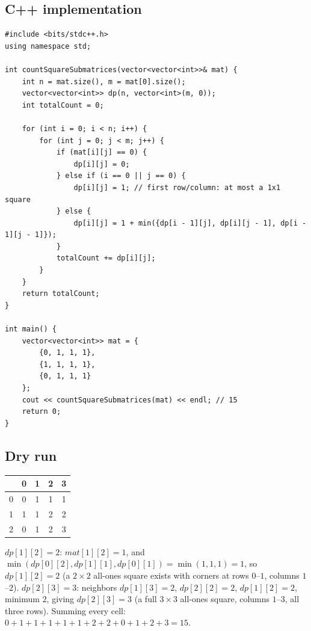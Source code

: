 \subsection*{C++ implementation}

\begin{lstlisting}
#include <bits/stdc++.h>
using namespace std;

int countSquareSubmatrices(vector<vector<int>>& mat) {
    int n = mat.size(), m = mat[0].size();
    vector<vector<int>> dp(n, vector<int>(m, 0));
    int totalCount = 0;

    for (int i = 0; i < n; i++) {
        for (int j = 0; j < m; j++) {
            if (mat[i][j] == 0) {
                dp[i][j] = 0;
            } else if (i == 0 || j == 0) {
                dp[i][j] = 1; // first row/column: at most a 1x1 square
            } else {
                dp[i][j] = 1 + min({dp[i - 1][j], dp[i][j - 1], dp[i - 1][j - 1]});
            }
            totalCount += dp[i][j];
        }
    }
    return totalCount;
}

int main() {
    vector<vector<int>> mat = {
        {0, 1, 1, 1},
        {1, 1, 1, 1},
        {0, 1, 1, 1}
    };
    cout << countSquareSubmatrices(mat) << endl; // 15
    return 0;
}
\end{lstlisting}

\subsection*{Dry run}


\begin{center}
\begin{tabular}{c|c|c|c|c}
 & 0 & 1 & 2 & 3 \\ \hline
0 & 0 & 1 & 1 & 1 \\ \hline
1 & 1 & 1 & 2 & 2 \\ \hline
2 & 0 & 1 & 2 & 3
\end{tabular}
\end{center}

$\textit{dp}[1][2]=2$: $\textit{mat}[1][2]=1$, and
$\min(\textit{dp}[0][2],\textit{dp}[1][1],\textit{dp}[0][1])=
\min(1,1,1)=1$, so $\textit{dp}[1][2]=2$ (a $2\times2$ all-ones square
exists with corners at rows $0$--$1$, columns $1$--$2$).
$\textit{dp}[2][3]=3$: neighbors $\textit{dp}[1][3]=2$,
$\textit{dp}[2][2]=2$, $\textit{dp}[1][2]=2$, minimum $2$, giving
$\textit{dp}[2][3]=3$ (a full $3\times3$ all-ones square, columns
$1$--$3$, all three rows). Summing every cell:
$0{+}1{+}1{+}1{+}1{+}1{+}2{+}2{+}0{+}1{+}2{+}3 = 15$.

